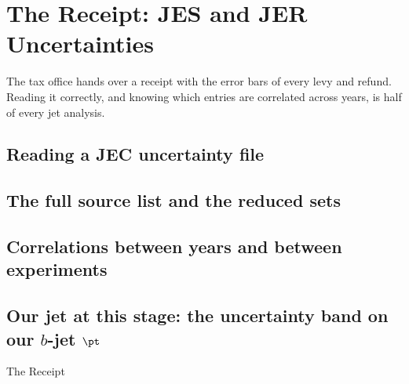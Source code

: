 \chapter{The Receipt: JES and JER Uncertainties}
\label{ch:the_receipt}

\begin{journeybox}
The tax office hands over a receipt with the error bars of every levy and
refund. Reading it correctly, and knowing which entries are correlated across
years, is half of every jet analysis.
\end{journeybox}


\section{Reading a JEC uncertainty file}
\label{sec:the_receipt:reading_a_jec_uncertainty_file}

\section{The full source list and the reduced sets}
\label{sec:the_receipt:the_full_source_list_and_the_reduced_set}

\section{Correlations between years and between experiments}
\label{sec:the_receipt:correlations_between_years_and_between_e}

\section{Our jet at this stage: the uncertainty band on our $b$-jet $\pt$}
\label{sec:the_receipt:our_jet_at_this_stage_the_uncertainty_ba}

\begin{ledger}{The Receipt}
\end{ledger}

